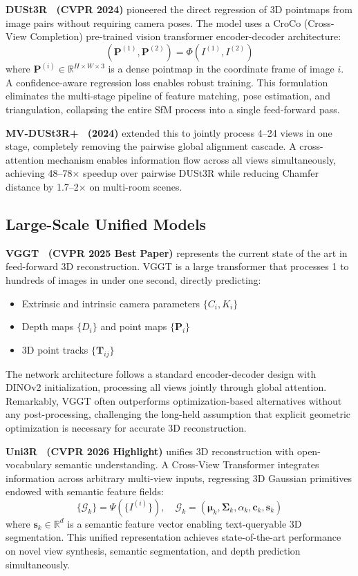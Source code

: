 \documentclass[journal]{IEEEtran}
\begin{document}
\textbf{DUSt3R~\cite{dust3r} (CVPR 2024)} pioneered the direct regression of 3D pointmaps from image pairs without requiring camera poses. The model uses a CroCo (Cross-View Completion) pre-trained vision transformer encoder-decoder architecture:
\begin{equation}
(\mathbf{P}^{(1)}, \mathbf{P}^{(2)}) = \Phi(I^{(1)}, I^{(2)})
\end{equation}
where $\mathbf{P}^{(i)} \in \mathbb{R}^{H\times W\times 3}$ is a dense pointmap in the coordinate frame of image $i$. A confidence-aware regression loss enables robust training. This formulation eliminates the multi-stage pipeline of feature matching, pose estimation, and triangulation, collapsing the entire SfM process into a single feed-forward pass.

\textbf{MV-DUSt3R+~\cite{mvdust3r} (2024)} extended this to jointly process 4--24 views in one stage, completely removing the pairwise global alignment cascade. A cross-attention mechanism enables information flow across all views simultaneously, achieving 48--78$\times$ speedup over pairwise DUSt3R while reducing Chamfer distance by 1.7--2$\times$ on multi-room scenes.

\subsection{Large-Scale Unified Models}

\textbf{VGGT~\cite{vggt} (CVPR 2025 Best Paper)} represents the current state of the art in feed-forward 3D reconstruction. VGGT is a large transformer that processes 1 to hundreds of images in under one second, directly predicting:
\begin{itemize}
    \item Extrinsic and intrinsic camera parameters $\{C_i, K_i\}$
    \item Depth maps $\{D_i\}$ and point maps $\{\mathbf{P}_i\}$
    \item 3D point tracks $\{\mathbf{T}_{ij}\}$
\end{itemize}
The network architecture follows a standard encoder-decoder design with DINOv2 initialization, processing all views jointly through global attention. Remarkably, VGGT often outperforms optimization-based alternatives without any post-processing, challenging the long-held assumption that explicit geometric optimization is necessary for accurate 3D reconstruction.

\textbf{Uni3R~\cite{uni3r} (CVPR 2026 Highlight)} unifies 3D reconstruction with open-vocabulary semantic understanding. A Cross-View Transformer integrates information across arbitrary multi-view inputs, regressing 3D Gaussian primitives endowed with semantic feature fields:
\begin{equation}
\{\mathcal{G}_k\} = \Psi(\{I^{(i)}\}), \quad \mathcal{G}_k = (\boldsymbol{\mu}_k, \boldsymbol{\Sigma}_k, \alpha_k, \mathbf{c}_k, \mathbf{s}_k)
\end{equation}
where $\mathbf{s}_k \in \mathbb{R}^d$ is a semantic feature vector enabling text-queryable 3D segmentation. This unified representation achieves state-of-the-art performance on novel view synthesis, semantic segmentation, and depth prediction simultaneously.
\end{document}
